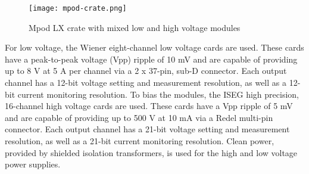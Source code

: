 \begin{figure}[hbt] 
\centering 
\texttt{[image: mpod-crate.png]}
\caption{Mpod LX crate with mixed low and high voltage modules}
\label{fig:mpod-crate}
\end{figure}

For low voltage, the Wiener eight-channel low voltage cards are used. These cards have a peak-to-peak voltage (Vpp) ripple of 10 mV and are capable of providing up to 8 V at 5 A per channel via a 2 x 37-pin, sub-D connector. Each output channel has a 12-bit voltage setting and measurement resolution, as well as a 12-bit current monitoring resolution. To bias the modules, the ISEG high precision, 16-channel high voltage cards are used. These cards have a Vpp ripple of 5 mV and are capable of providing up to 500 V at 10 mA via a Redel multi-pin connector. Each output channel has a 21-bit voltage setting and measurement resolution, as well as a 21-bit current monitoring resolution. Clean power, provided by shielded isolation transformers, is used for the high and low voltage power supplies.

